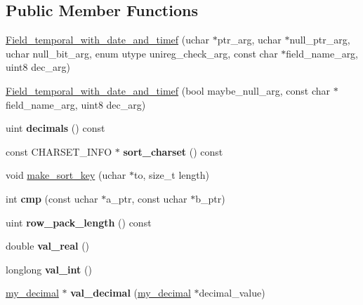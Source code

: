 \subsection*{Public Member Functions}
\begin{DoxyCompactItemize}
\item 
\mbox{\hyperlink{classField__temporal__with__date__and__timef_abd543fce5b4062ed73faf037ec246838}{Field\+\_\+temporal\+\_\+with\+\_\+date\+\_\+and\+\_\+timef}} (uchar $\ast$ptr\+\_\+arg, uchar $\ast$null\+\_\+ptr\+\_\+arg, uchar null\+\_\+bit\+\_\+arg, enum utype unireg\+\_\+check\+\_\+arg, const char $\ast$field\+\_\+name\+\_\+arg, uint8 dec\+\_\+arg)
\item 
\mbox{\hyperlink{classField__temporal__with__date__and__timef_ae0d5affe5618da2f78f45a9ca2304a0b}{Field\+\_\+temporal\+\_\+with\+\_\+date\+\_\+and\+\_\+timef}} (bool maybe\+\_\+null\+\_\+arg, const char $\ast$field\+\_\+name\+\_\+arg, uint8 dec\+\_\+arg)
\item 
\mbox{\label{classField__temporal__with__date__and__timef_a8dbf9da94a52b15b0df93e0c38c2640d}} 
uint {\bfseries decimals} () const
\item 
\mbox{\label{classField__temporal__with__date__and__timef_ae47cbcbb2066f7b4a225b167bd119a65}} 
const C\+H\+A\+R\+S\+E\+T\+\_\+\+I\+N\+FO $\ast$ {\bfseries sort\+\_\+charset} () const
\item 
void \mbox{\hyperlink{classField__temporal__with__date__and__timef_abf3eb20d941cf5bc7404cf9edc602f46}{make\+\_\+sort\+\_\+key}} (uchar $\ast$to, size\+\_\+t length)
\item 
\mbox{\label{classField__temporal__with__date__and__timef_a538bce267697abe887de91794a70ebd0}} 
int {\bfseries cmp} (const uchar $\ast$a\+\_\+ptr, const uchar $\ast$b\+\_\+ptr)
\item 
\mbox{\label{classField__temporal__with__date__and__timef_a4461aa2e90c931c3f6c4bdee7fc865be}} 
uint {\bfseries row\+\_\+pack\+\_\+length} () const
\item 
\mbox{\label{classField__temporal__with__date__and__timef_a1efe67a0bb54823226114606d3103a81}} 
double {\bfseries val\+\_\+real} ()
\item 
\mbox{\label{classField__temporal__with__date__and__timef_ae4f25958eedb42b599a0bf3ba6dbb07c}} 
longlong {\bfseries val\+\_\+int} ()
\item 
\mbox{\label{classField__temporal__with__date__and__timef_a8dde14fcd2e1c09e0c64d5c295f96407}} 
\mbox{\hyperlink{classmy__decimal}{my\+\_\+decimal}} $\ast$ {\bfseries val\+\_\+decimal} (\mbox{\hyperlink{classmy__decimal}{my\+\_\+decimal}} $\ast$decimal\+\_\+value)
\end{DoxyCompactItemize}
